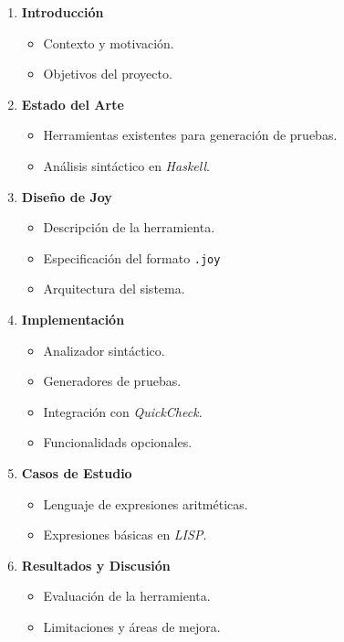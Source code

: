 \documentclass[12pt]{article}
\begin{document}
\begin{enumerate}
\item \textbf{Introducción}
  
  \begin{itemize}
  \item Contexto y motivación.
  \item Objetivos del proyecto.
  \end{itemize}

\item \textbf{Estado del Arte}

  \begin{itemize}
  \item Herramientas existentes para generación de pruebas.
  \item Análisis sintáctico en \textit{Haskell}.
  \end{itemize}

\item \textbf{Diseño de Joy}

  \begin{itemize}
  \item Descripción de la herramienta.
  \item Especificación del formato \texttt{.joy}
  \item Arquitectura del sistema.
  \end{itemize}

\item \textbf{Implementación}

  \begin{itemize}
  \item Analizador sintáctico.
  \item Generadores de pruebas.
  \item Integración con \textit{QuickCheck}.
  \item Funcionalidads opcionales.
  \end{itemize}
  
\item \textbf{Casos de Estudio}

  \begin{itemize}
  \item Lenguaje de expresiones aritméticas.
  \item Expresiones básicas en \textit{LISP}.
  \end{itemize}

\item \textbf{Resultados y Discusión}

  \begin{itemize}
  \item Evaluación de la herramienta.
  \item Limitaciones y áreas de mejora.
  \end{itemize}


\end{enumerate}
\end{document}
